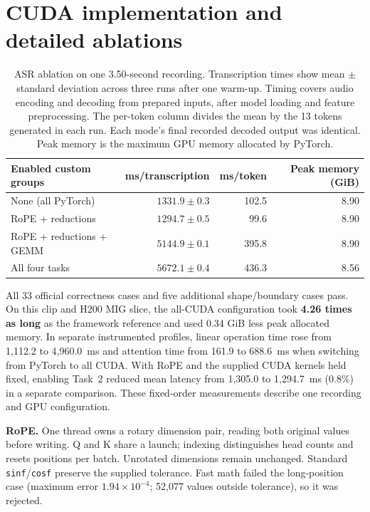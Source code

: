 \documentclass{article}
\begin{document}
\section{CUDA implementation and detailed ablations}
\label{app:kernels}
\begin{table}[h]
\centering
\caption{ASR ablation on one 3.50-second recording. Transcription times show mean $\pm$ standard deviation across three runs after one warm-up. Timing covers audio encoding and decoding from prepared inputs, after model loading and feature preprocessing. The per-token column divides the mean by the 13 tokens generated in each run. Each mode's final recorded decoded output was identical. Peak memory is the maximum GPU memory allocated by PyTorch.}
\label{tab:asr}
\begin{tabular}{lrrr}
\toprule
Enabled custom groups & ms/transcription & ms/token & Peak memory (GiB)\\
\midrule
None (all PyTorch) & $1331.9\pm0.3$ & 102.5 & 8.90\\
RoPE + reductions & $1294.7\pm0.5$ & 99.6 & 8.90\\
RoPE + reductions + GEMM & $5144.9\pm0.1$ & 395.8 & 8.90\\
All four tasks & $5672.1\pm0.4$ & 436.3 & 8.56\\
\bottomrule
\end{tabular}
\end{table}

All 33 official correctness cases and five additional shape/boundary cases pass. On this clip and H200 MIG slice, the all-CUDA configuration took \textbf{4.26 times as long} as the framework reference and used 0.34 GiB less peak allocated memory. In separate instrumented profiles, linear operation time rose from 1,112.2 to 4,960.0~ms and attention time from 161.9 to 688.6~ms when switching from PyTorch to all CUDA. With RoPE and the supplied CUDA kernels held fixed, enabling Task~2 reduced mean latency from 1,305.0 to 1,294.7~ms (0.8\%) in a separate comparison. These fixed-order measurements describe one recording and GPU configuration.

\textbf{RoPE.} One thread owns a rotary dimension pair, reading both original values before writing. Q and K share a launch; indexing distinguishes head counts and resets positions per batch. Unrotated dimensions remain unchanged. Standard \texttt{sinf}/\texttt{cosf} preserve the supplied tolerance. Fast math failed the long-position case (maximum error $1.94\times10^{-4}$; 52,077 values outside tolerance), so it was rejected.
\end{document}
